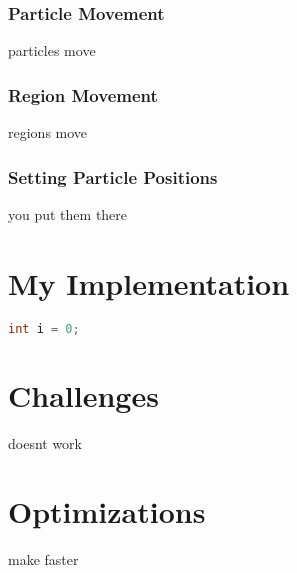 \documentclass[12pt,a4paper]{article}
\begin{document}
	\subsubsection{Particle Movement}
	particles move
	
	\subsubsection{Region Movement}
	regions move
	
	\subsubsection{Setting Particle Positions}
	you put them there
	
	\section{My Implementation}
	\begin{lstlisting}[language=C++]
	int i = 0;
	\end{lstlisting}
	
	\section{Challenges}
	doesnt work
	
	\section{Optimizations}
	make faster
	
	
	
	
	
\end{document}
